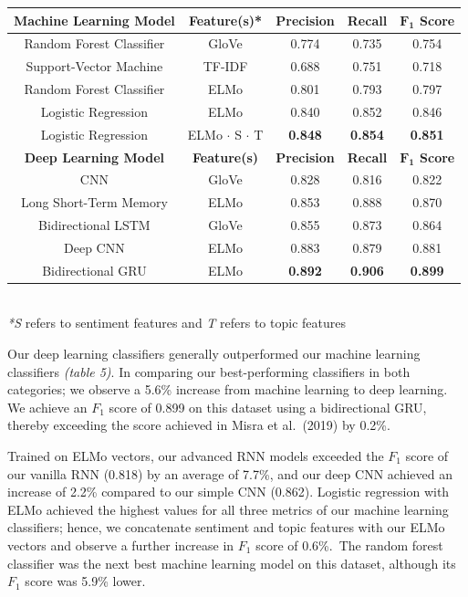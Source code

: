\documentclass[12pt,a4paper]{article}
\begin{document}
\begin{center}
	\begin{tabular}{c||c|c|c|c}
		\hline
		\textbf{Machine Learning Model}& \textbf{Feature(s)*} & \textbf{Precision} & \textbf{Recall} & \textbf{$\mathbf{F_1}$ Score}\\
		\hline\hline
		Random Forest Classifier & GloVe  & 0.774   & 0.735 & 0.754\\
		Support-Vector Machine & TF-IDF  & 0.688   & 0.751 & 0.718\\
		Random Forest Classifier & ELMo  & 0.801   & 0.793 & 0.797\\
		Logistic Regression & ELMo  & 0.840   & 0.852 & 0.846\\
		Logistic Regression & ELMo $\cdot$ S $\cdot$ T & \textbf{0.848}   & \textbf{0.854} & \textbf{0.851}\\
		\hline\hline
		\textbf{Deep Learning Model}& \textbf{Feature(s)} & \textbf{Precision} & \textbf{Recall} & \textbf{$\mathbf{F_1}$ Score}\\
		\hline
		CNN & GloVe  & 0.828 & 0.816 & 0.822\\
		Long Short-Term Memory & ELMo  & 0.853   & 0.888 & 0.870\\
		Bidirectional LSTM & GloVe  & 0.855   & 0.873 & 0.864\\
		Deep CNN & ELMo & 0.883   & 0.879 & 0.881\\
		Bidirectional GRU & ELMo  & \textbf{0.892}   & \textbf{0.906} & \textbf{0.899}\\
		\hline
	\end{tabular}\\\vspace{5pt}
	\textit{*S} refers to sentiment features and \textit{T} refers to topic features\\\vspace{-8pt}
\end{center}

\noindent Our deep learning classifiers generally outperformed our machine learning classifiers \textit{(table 5)}. In comparing our best-performing classifiers in both categories; we observe a 5.6\% increase from machine learning to deep learning. We achieve an $F_1$ score of 0.899 on this dataset using a bidirectional GRU, thereby exceeding the score achieved in Misra et al.\ (2019) by \cite{misra2019sarcasm} 0.2\%.

Trained on ELMo vectors, our advanced RNN models exceeded the $F_1$ score of our vanilla RNN (0.818) by an average of 7.7\%, and our deep CNN achieved an increase of 2.2\% compared to our simple CNN (0.862). Logistic regression with ELMo achieved the highest values for all three metrics of our machine learning classifiers; hence, we concatenate sentiment and topic features with our ELMo vectors and observe a further increase in $F_1$ score of 0.6\%.\ The random forest classifier was the next best machine learning model on this dataset, although its $F_1$ score was 5.9\% lower.
\end{document}
